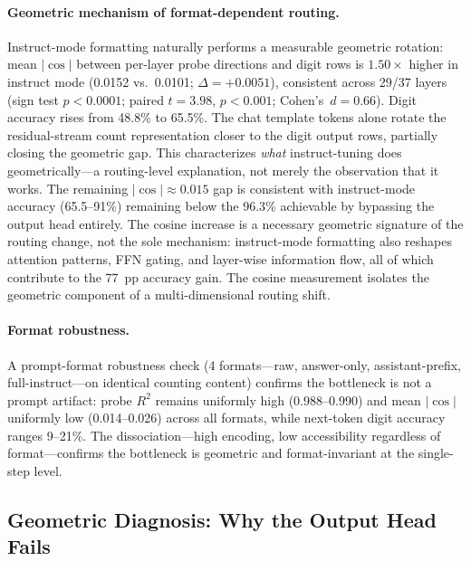 \documentclass{article}
\begin{document}
\paragraph{Geometric mechanism of format-dependent routing.}
Instruct-mode formatting naturally performs a measurable geometric rotation: mean $|\cos|$ between per-layer probe directions and digit rows is $\mathbf{1.50\times}$ higher in instruct mode (0.0152 vs.\ 0.0101; $\Delta = +0.0051$), consistent across 29/37 layers (sign test $p < 0.0001$; paired $t = 3.98$, $p < 0.001$; Cohen's~$d = 0.66$).
Digit accuracy rises from 48.8\% to 65.5\%.
The chat template tokens alone rotate the residual-stream count representation closer to the digit output rows, partially closing the geometric gap.
This characterizes \emph{what} instruct-tuning does geometrically---a routing-level explanation, not merely the observation that it works.
The remaining $|\cos| \approx 0.015$ gap is consistent with instruct-mode accuracy (65.5--91\%) remaining below the 96.3\% achievable by bypassing the output head entirely.
The cosine increase is a necessary geometric signature of the routing change,
not the sole mechanism: instruct-mode formatting also reshapes attention patterns,
FFN gating, and layer-wise information flow, all of which contribute to the
77~pp accuracy gain. The cosine measurement isolates the geometric component
of a multi-dimensional routing shift.

\paragraph{Format robustness.}
A prompt-format robustness check (4 formats---raw, answer-only, assistant-prefix, full-instruct---on identical counting content) confirms the bottleneck is not a prompt artifact:
probe $R^2$ remains uniformly high (0.988--0.990) and mean $|\cos|$ uniformly low (0.014--0.026) across all formats, while next-token digit accuracy ranges 9--21\%.
The dissociation---high encoding, low accessibility regardless of format---confirms the bottleneck is geometric and format-invariant at the single-step level.

\subsection{Geometric Diagnosis: Why the Output Head Fails}
\label{sec:geometry}
\end{document}
